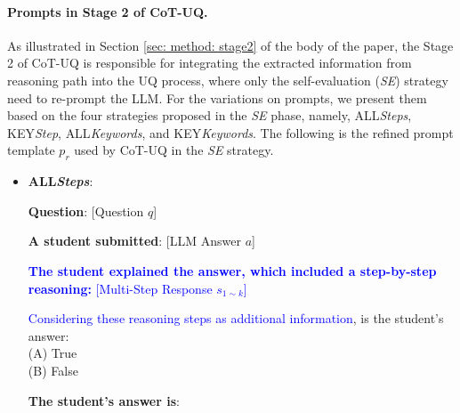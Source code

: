 \documentclass[11pt]{article}
\begin{document}
\paragraph{Prompts in Stage 2 of CoT-UQ.}
As illustrated in Section \ref{sec: method: stage2} of the body of the paper, the Stage 2 of CoT-UQ is responsible for integrating the extracted information from reasoning path into the UQ process, where only the self-evaluation (\textit{SE}) strategy need to re-prompt the LLM.
For the variations on prompts, we present them based on the four strategies proposed in the \textit{SE} phase, namely, {\small ALL}\textit{Steps}, {\small KEY}\textit{Step}, {\small ALL}\textit{Keywords}, and {\small KEY}\textit{Keywords}. The following is the refined prompt template $p_r$ used by CoT-UQ in the \textit{SE} strategy.

\begin{itemize}
    \item \textbf{{\small ALL}\textit{Steps}}:

    \begin{tcolorbox}[
        colframe=black,  %
        colback=white,   %
        rounded corners=north, %
        arc=1mm, %
        boxrule=.4mm, %
        width=\linewidth, %
        coltitle=black, 
        colbacktitle=white,
        title={\textbf{P(True) \textcolor{blue}{w/ {\small ALL}\textit{Steps}}}}, %
        fonttitle=\bfseries, %
    ]
    
    \textbf{Question}: [Question $q$]
    
    \textbf{A student submitted}: [LLM Answer $a$]

    \textcolor{blue}{\textbf{The student explained the answer, which included a step-by-step reasoning: } [Multi-Step Response $s_{1 \sim k}$]}
    
    \vspace{5pt}
    
    \textcolor{blue}{Considering these reasoning steps as additional information}, is the student’s answer:\\
    (A) True\\
    (B) False
    
    \vspace{5pt}
    
    \textbf{The student's answer is}: 
    
    \end{tcolorbox}


\end{itemize}
\end{document}
